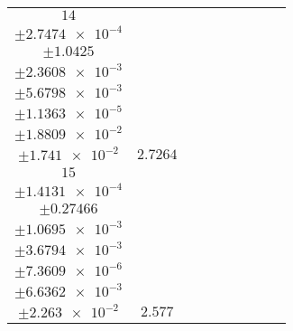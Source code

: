 \documentclass[8pt]{article}
\begin{document}
\begin{longtable}[l]{c c c c c c c c c}
$\num{14}$ & \begin{tabular}[c]{@{}c@{}}$\num{3.1712e-2}$ \\ $\pm\num{2.7474e-4}$\end{tabular} & \begin{tabular}[c]{@{}c@{}}$\num{-1.1494}$ \\ $\pm\num{1.0425}$\end{tabular} & \begin{tabular}[c]{@{}c@{}}$\num{-6.8113}$ \\ $\pm\num{2.3608e-3}$\end{tabular} & \begin{tabular}[c]{@{}c@{}}$\num{1.6025e+3}$ \\ $\pm\num{5.6798e-3}$\end{tabular} & \begin{tabular}[c]{@{}c@{}}$\num{3.2059}$ \\ $\pm\num{1.1363e-5}$\end{tabular} & \begin{tabular}[c]{@{}c@{}}$\num{1.2125}$ \\ $\pm\num{1.8809e-2}$\end{tabular} & \begin{tabular}[c]{@{}c@{}}$\num{4.1112}$ \\ $\pm\num{1.741e-2}$\end{tabular} & $\num{2.7264}$\\
$\num{15}$ & \begin{tabular}[c]{@{}c@{}}$\num{3.0049e-2}$ \\ $\pm\num{1.4131e-4}$\end{tabular} & \begin{tabular}[c]{@{}c@{}}$\num{-0.60637}$ \\ $\pm\num{0.27466}$\end{tabular} & \begin{tabular}[c]{@{}c@{}}$\num{-2.5869}$ \\ $\pm\num{1.0695e-3}$\end{tabular} & \begin{tabular}[c]{@{}c@{}}$\num{1.6067e+3}$ \\ $\pm\num{3.6794e-3}$\end{tabular} & \begin{tabular}[c]{@{}c@{}}$\num{3.2143}$ \\ $\pm\num{7.3609e-6}$\end{tabular} & \begin{tabular}[c]{@{}c@{}}$\num{1.1616}$ \\ $\pm\num{6.6362e-3}$\end{tabular} & \begin{tabular}[c]{@{}c@{}}$\num{4.1742}$ \\ $\pm\num{2.263e-2}$\end{tabular} & $\num{2.577}$\\

\end{longtable}
\end{document}

